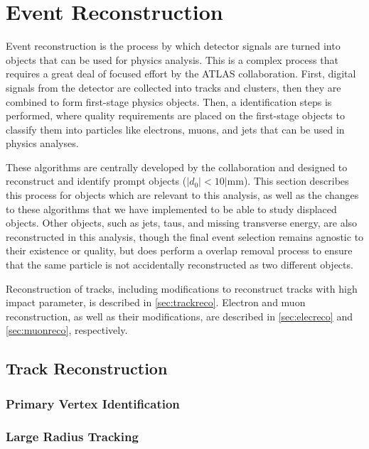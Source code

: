\chapter{Event Reconstruction}
\label{ch:EventReconstruction}

Event reconstruction is the process by which detector signals are turned into objects that can be used for physics analysis. This is a complex process that requires a great deal of focused effort by the \ac{ATLAS} collaboration. First, digital signals from the detector are collected into tracks and clusters, then they are combined to form first-stage physics objects. Then, a identification steps is performed, where quality requirements are placed on the first-stage objects to classify them into particles like electrons, muons, and jets that can be used in physics analyses. 

These algorithms are centrally developed by the collaboration and designed to reconstruct and identify prompt objects ($|d_{0}| < 10| \textrm{mm}$). This section describes this process for objects which are relevant to this analysis, as well as the changes to these algorithms that we have implemented to be able to study displaced objects. Other objects, such as jets, taus, and missing transverse energy, are also reconstructed in this analysis, though the final event selection remains agnostic to their existence or quality, but does perform a overlap removal process to ensure that the same particle is not accidentally reconstructed as two different objects. 

Reconstruction of tracks, including modifications to reconstruct tracks with high impact parameter, is described in \autoref{sec:trackreco}. Electron and muon reconstruction, as well as their modifications, are described in \autoref{sec:elecreco} and \autoref{sec:muonreco}, respectively. 



\section{Track Reconstruction}
\label{sec:trackreco}


\subsection{Primary Vertex Identification}
\subsection{Large Radius Tracking}




